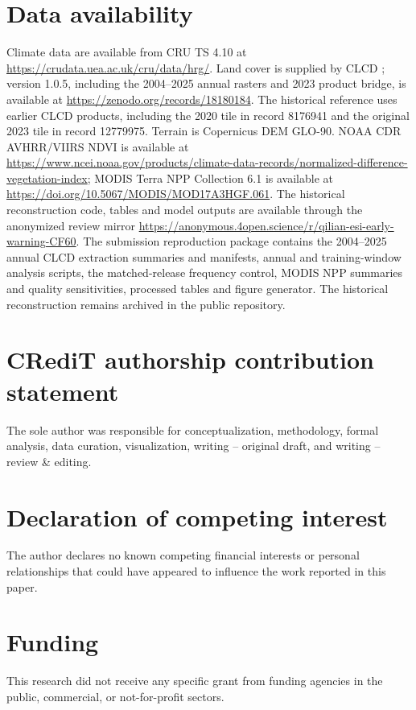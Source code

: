\documentclass[preprint,11pt,authoryear]{elsarticle}
\begin{document}
\section*{Data availability}
Climate data are available from CRU TS 4.10 \citep{cru_ts410} at \url{https://crudata.uea.ac.uk/cru/data/hrg/}. Land cover is supplied by CLCD \citep{yang2021clcd,yang2024clcd}; version 1.0.5, including the 2004--2025 annual rasters and 2023 product bridge, is available at \url{https://zenodo.org/records/18180184}. The historical reference uses earlier CLCD products, including the 2020 tile in record 8176941 and the original 2023 tile in record 12779975. Terrain is Copernicus DEM GLO-90. NOAA CDR AVHRR/VIIRS NDVI is available at \url{https://www.ncei.noaa.gov/products/climate-data-records/normalized-difference-vegetation-index}; MODIS Terra NPP Collection 6.1 is available at \url{https://doi.org/10.5067/MODIS/MOD17A3HGF.061}. The historical reconstruction code, tables and model outputs are available through the anonymized review mirror \url{https://anonymous.4open.science/r/qilian-esi-early-warning-CF60}. The submission reproduction package contains the 2004--2025 annual CLCD extraction summaries and manifests, annual and training-window analysis scripts, the matched-release frequency control, MODIS NPP summaries and quality sensitivities, processed tables and figure generator. The historical reconstruction remains archived in the public repository.

\section*{CRediT authorship contribution statement}
The sole author was responsible for conceptualization, methodology, formal analysis, data curation, visualization, writing -- original draft, and writing -- review \& editing.

\section*{Declaration of competing interest}
The author declares no known competing financial interests or personal relationships that could have appeared to influence the work reported in this paper.

\section*{Funding}
This research did not receive any specific grant from funding agencies in the public, commercial, or not-for-profit sectors.
\end{document}
